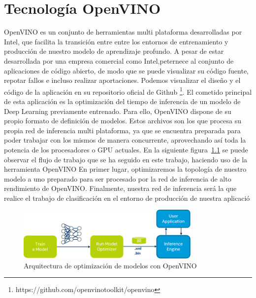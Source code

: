 \cleardoublepage
\mbox{}

\lstset{
language=Python,
basicstyle=\small\sffamily,
numbers=left,
numberstyle=\tiny,
frame=tb,
columns=fullflexible,
showstringspaces=false
}

\chapter{Tecnología OpenVINO}
\label{ch:chapter3}

OpenVINO es un conjunto de herramientas multi plataforma desarrolladas por Intel, que facilita la transición entre entre los entornos de entrenamiento y producción de nuestro modelo de aprendizaje profundo.
A pesar de estar desarrollada por una empresa comercial como Intel,peternece al conjunto de aplicaciones de código abierto, de modo que se puede visualizar su código fuente, repotar fallos e incluso realizar aportaciones.
Podemos visualizar el diseño y el código de la aplicación en su repositorio oficial de Github \footnote{https://github.com/openvinotoolkit/openvino}.
El cometido principal de esta aplicación es la optimización del tiempo de inferencia de un modelo de Deep Learning previamente entrenado.
Para ello, OpenVINO dispone de su propio formato de definición de modelos.
Estos archivos son los que procesa su propia red de inferencia multi plataforma, ya que se encuentra preparada para poder trabajar con los mismos de manera concurrente, aprovechando así toda la potencia de los procesadores o GPU actuales.
En la siguiente figura~\ref{fig:Arquitectura de optimización de modelos con OpenVINO} se puede observar el flujo de trabajo que se ha seguido en este trabajo, haciendo uso de la herramienta OpenVINO
En primer lugar, optimizaremos la topología de nuestro modelo a uno preparado para ser procesado por la red de inferencia de alto rendimiento de OpenVINO.
Finalmente, nuestra red de inferencia será la que realice el trabajo de clasificación en el entorno de producción de nuestra aplicació



\begin{figure}
    \centering
    \includegraphics[width=0.8\textwidth]{images/chapter3/openvino_workflow.png}
    \caption{Arquitectura de optimización de modelos con OpenVINO}
    \label{fig:Arquitectura de optimización de modelos con OpenVINO}
\end{figure}



